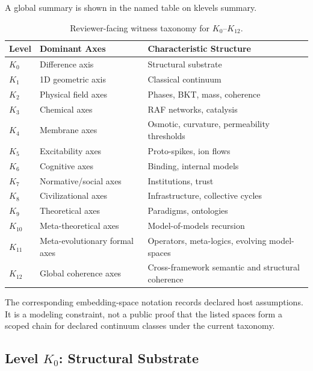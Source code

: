 A global summary is shown in the named table on klevels summary.

\begin{table}[h!]
\centering
\begingroup
\footnotesize
\RaggedRight
\setlength{\tabcolsep}{4pt}
\begin{tabular}{@{}L{0.10\textwidth}L{0.25\textwidth}L{0.49\textwidth}@{}}
\hline
Level & Dominant Axes & Characteristic Structure \\
\hline
\(K_0\) & Difference axis & Structural substrate \\
\(K_1\) & 1D geometric axis & Classical continuum \\
\(K_2\) & Physical field axes & Phases, BKT, mass, coherence \\
\(K_3\) & Chemical axes & RAF networks, catalysis \\
\(K_4\) & Membrane axes & Osmotic, curvature, permeability thresholds \\
\(K_5\) & Excitability axes & Proto-spikes, ion flows \\
\(K_6\) & Cognitive axes & Binding, internal models \\
\(K_7\) & Normative/social axes & Institutions, trust \\
\(K_8\) & Civilizational axes & Infrastructure, collective cycles \\
\(K_9\) & Theoretical axes & Paradigms, ontologies \\
\(K_{10}\) & Meta-theoretical axes & Model-of-models recursion \\
\(K_{11}\) & Meta-evolutionary formal axes & Operators, meta-logics, evolving model-spaces \\
\(K_{12}\) & Global coherence axes & Cross-framework semantic and structural coherence \\
\hline
\end{tabular}
\endgroup
\caption{Reviewer-facing witness taxonomy for \texorpdfstring{\(K_0\)}{K0}--\(K_{12}\).}
\label{tab:klevels-summary}
\end{table}

The corresponding embedding-space notation records declared host assumptions. It is a modeling constraint, not a public proof that the listed spaces form a scoped chain for declared continuum classes under the current taxonomy.


\subsection{Level \texorpdfstring{\texorpdfstring{$K_0$}{K\_0}}{K0}: Structural Substrate}

